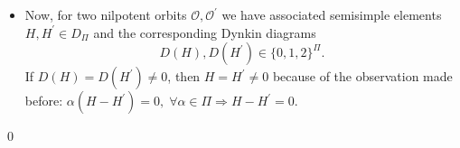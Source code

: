 \begin{itemize}
    Now, let $\alpha\in\Pi,\beta \in\Delta_-$, then $\alpha+\beta\in\Delta$ only if  
    if $\alpha+\beta\in\Delta_-$. Otherwise, if $\alpha+\beta\in\Delta_+$, 
    then $\alpha=(\alpha+\beta)-\beta$ will not be simple.\par
    With this observation we see that 
    \begin{equation}
        [X_\alpha, Y]\in \overline{\fr{n}},\;\forall \alpha\in\Pi,
    \end{equation}
    because $Y\in\overline{\fr{n}}$, since $\ad(H)Y=-2Y$ and $H\in D_\Pi$. Then 
    \begin{equation}
        \begin{split}
            &[X_\alpha,Y]=0\Rightarrow X_\alpha\in\fr{g}^Y\Rightarrow \alpha(H)\leq0, \text{ so } \alpha(H)=0\\
            &[X_\alpha,Y]\neq0\Rightarrow \alpha(H)-2\leq0\text{ (by the above observation), so } \alpha(H)\leq 2 
        \end{split}
    \end{equation}
    \item Now, for two nilpotent orbits $\mathcal{O},\mathcal{O}^\prime$ we have associated 
    semisimple elements $H,H^\prime\in D_\Pi$ and the corresponding Dynkin diagrams 
    \begin{equation}
        D(H),D(H^\prime)\in\{0,1,2\}^\Pi.
    \end{equation}
    If $D(H)=D(H^\prime)\neq0$, then $H=H^\prime\neq0$ because of the observation made before: 
    $\alpha(H-H^\prime)=0,\;\forall \alpha\in\Pi\Rightarrow H-H^\prime=0$.
\end{itemize}
\qed

